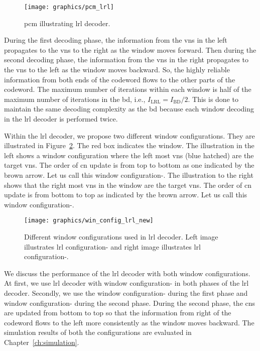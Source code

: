 \begin{figure}[htbp]
  \centering
  \texttt{[image: graphics/pcm\_lrl]}
  \caption{\gls{pcm} illustrating \gls{lrl} decoder.}
  \label{fig:pcm_lrl}
\end{figure}
During the first decoding phase, the information from the \glspl{vn} in the left propagates to the \glspl{vn} to the right as the window moves forward. Then during the second decoding phase, the information from the \glspl{vn} in the right propagates to the \glspl{vn} to the left as the window moves backward. So, the highly reliable information from both ends of the codeword flows to the other parts of the codeword. The maximum number of iterations within each window is half of the maximum number of iterations in the \gls{bd}, i.e., $I_{\text{LRL}}=I_{\text{BD}}/2$. This is done to maintain the same decoding complexity as the \gls{bd} because each window decoding in the \gls{lrl} decoder is performed twice.

Within the \gls{lrl} decoder, we propose two different window configurations. They are illustrated in Figure~\ref{fig:win_config_lrl}. The red box indicates the window. The illustration in the left shows a window configuration where the left most \glspl{vn} (blue hatched) are the target \glspl{vn}. The order of \gls{cn} update is from top to bottom as one indicated by the brown arrow. Let us call this window configuration-. The illustration to the right shows that the right most \glspl{vn} in the window are the target \glspl{vn}. The order of \gls{cn} update is from bottom to top as indicated by the brown arrow. Let us call this window configuration-.

\begin{figure}[htbp]
  \centering
  \texttt{[image: graphics/win\_config\_lrl\_new]}
  \caption{Different window configurations used in \gls{lrl} decoder. Left image illustrates \gls{lrl} configuration- and right image illustrates \gls{lrl} configuration-.}
  \label{fig:win_config_lrl}
\end{figure}

We discuss the performance of the \gls{lrl} decoder with both window configurations. At first, we use \gls{lrl} decoder with window configuration- in both phases of the \gls{lrl} decoder. Secondly, we use the window configuration- during the first phase and window configuration- during the second phase. During the second phase, the \glspl{cn} are updated from bottom to top so that the information from right of the codeword flows to the left more consistently as the window moves backward. The simulation results of both the configurations are evaluated in Chapter~\ref{ch:simulation}.

